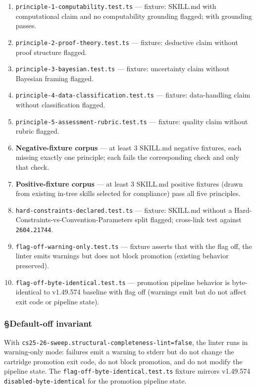 \documentclass[11pt,letterpaper]{article}
\newcommand{\arxivid}[1]{\texttt{\textcolor{accent}{#1}}}
\providecommand{\tightlist}{\setlength{\itemsep}{0pt}\setlength{\parskip}{0pt}}
\begin{document}
\begin{enumerate}
\def\labelenumi{\arabic{enumi}.}
\tightlist
\item
  \texttt{principle-1-computability.test.ts} --- fixture: SKILL.md with
  computational claim and no computability grounding flagged; with
  grounding passes.
\item
  \texttt{principle-2-proof-theory.test.ts} --- fixture: deductive claim
  without proof structure flagged.
\item
  \texttt{principle-3-bayesian.test.ts} --- fixture: uncertainty claim
  without Bayesian framing flagged.
\item
  \texttt{principle-4-data-classification.test.ts} --- fixture:
  data-handling claim without classification flagged.
\item
  \texttt{principle-5-assessment-rubric.test.ts} --- fixture: quality
  claim without rubric flagged.
\item
  \textbf{Negative-fixture corpus} --- at least 3 SKILL.md negative
  fixtures, each missing exactly one principle; each fails the
  corresponding check and only that check.
\item
  \textbf{Positive-fixture corpus} --- at least 3 SKILL.md positive
  fixtures (drawn from existing in-tree skills selected for compliance)
  pass all five principles.
\item
  \texttt{hard-constraints-declared.test.ts} --- fixture: SKILL.md
  without a Hard-Constraints-vs-Convention-Parameters split flagged;
  cross-link test against \arxivid{2604.21744}.
\item
  \texttt{flag-off-warning-only.test.ts} --- fixture asserts that with
  the flag off, the linter emits warnings but does not block promotion
  (existing behavior preserved).
\item
  \texttt{flag-off-byte-identical.test.ts} --- promotion pipeline
  behavior is byte-identical to v1.49.574 baseline with flag off
  (warnings emit but do not affect exit code or pipeline state).
\end{enumerate}

\subsubsection{§Default-off invariant}

With \texttt{cs25-26-sweep.structural-completeness-lint=false}, the
linter runs in warning-only mode: failures emit a warning to stderr but
do not change the cartridge promotion exit code, do not block promotion,
and do not modify the pipeline state. The
\texttt{flag-off-byte-identical.test.ts} fixture mirrors v1.49.574
\texttt{disabled-byte-identical} for the promotion pipeline state.
\end{document}
